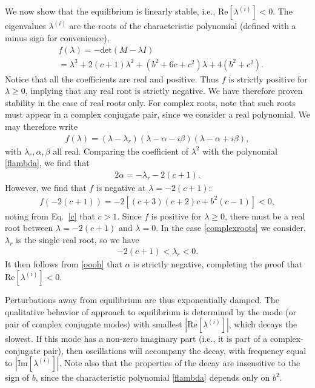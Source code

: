 \documentclass[amsmath,amssymb,nofootinbib,notitlepage,superscriptaddress,twocolumn]{revtex4-2}
\begin{document}
We now show that the equilibrium is linearly stable, i.e., $\textrm{Re}[\lambda^{(i)}]<0$.  The eigenvalues $\lambda^{(i)}$ are the roots of the characteristic polynomial (defined with a minus sign for convenience),
\begin{align}\label{flambda}
    &f(\lambda) = - \textrm{det} (M - \lambda I) \nonumber \\ 
    & =\lambda^3+2(c+1)\lambda^2+(b^2+6c+c^2)\lambda+4(b^2+c^2).
\end{align}
Notice that all the coefficients are real and positive.  Thus $f$ is strictly positive for $\lambda \geq 0$, implying that any real root is strictly negative.  We have therefore proven stability in the case of real roots only.  For complex roots, note that such roots must appear in a complex conjugate pair, since we consider a real polynomial.  We may therefore write
\begin{align}\label{complexroots}
    f(\lambda)=(\lambda-\lambda_r)(\lambda-\alpha -i \beta)(\lambda-\alpha + i \beta),
\end{align}
with $\lambda_r,\alpha,\beta$ all real.  Comparing the coefficient of $\lambda^2$ with the polynomial \eqref{flambda}, we find that
\begin{align}\label{oooh}
    2\alpha = -\lambda_r-2(c+1).
\end{align}
However, we find that $f$ is negative at $\lambda=-2(c+1)$:
\begin{align}
    f(-2(c+1))=-2\left[(c+3)(c+2)c+b^2(c-1)\right] <0,
\end{align}
noting from Eq.~\eqref{c} that $c>1$.  Since $f$ is positive for $\lambda \geq 0$, there must be a real root between $\lambda=-2(c+1)$ and $\lambda=0$.  In the case \eqref{complexroots} we consider, $\lambda_r$ is the single real root, so we have
\begin{align}
   -2(c+1) < \lambda_r < 0.
\end{align}
It then follows from \eqref{oooh} that $\alpha$ is strictly negative, completing the proof that $\textrm{Re}[\lambda^{(i)}]<0$. 

Perturbations away from equilibrium are thus exponentially damped.  The qualitative behavior of approach to equilibrium is determined by the mode (or pair of complex conjugate modes) with smallest $|\textrm{Re}[\lambda^{(i)}]|$, which decays the slowest.  If this mode has a non-zero imaginary part (i.e., it is part of a complex-conjugate pair), then oscillations will accompany the decay, with frequency equal to $|\textrm{Im}[\lambda^{(i)}]|$.  Note also that the properties of the decay are insensitive to the sign of $b$, since the characteristic polynomial \eqref{flambda} depends only on $b^2$.
\end{document}
